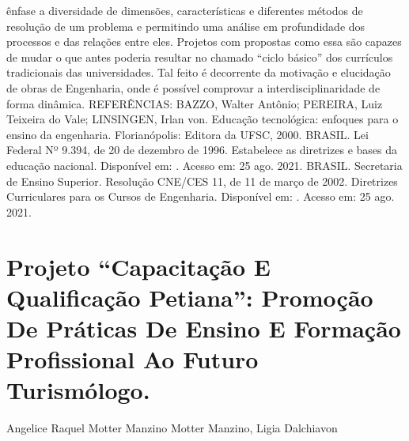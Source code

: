 ênfase a diversidade de dimensões, características e diferentes métodos de resolução de um 
problema e permitindo uma análise em profundidade dos processos e das relações entre eles. 
Projetos com propostas como essa são capazes de mudar o que antes poderia resultar no chamado 
“ciclo básico” dos currículos tradicionais das universidades. Tal feito é decorrente da motivação e 
elucidação de obras de Engenharia, onde é possível comprovar a interdisciplinaridade de forma 
dinâmica.
REFERÊNCIAS:
BAZZO, Walter Antônio; PEREIRA, Luiz Teixeira do Vale; LINSINGEN, Irlan von. Educação 
tecnológica: enfoques para o ensino da engenharia. Florianópolis: Editora da UFSC, 2000.
BRASIL. Lei Federal Nº 9.394, de 20 de dezembro de 1996. Estabelece as diretrizes e bases da 
educação nacional. Disponível em: .
Acesso em: 25 ago. 2021.
BRASIL. Secretaria de Ensino Superior. Resolução CNE/CES 11, de 11 de março de 2002. 
Diretrizes Curriculares para os Cursos de Engenharia. Disponível em:
. Acesso em: 25 ago. 2021.




\section*{Projeto “Capacitação E Qualificação Petiana”: Promoção De Práticas De Ensino E Formação  Profissional Ao Futuro Turismólogo. }

Angelice Raquel Motter Manzino Motter Manzino, Ligia Dalchiavon

